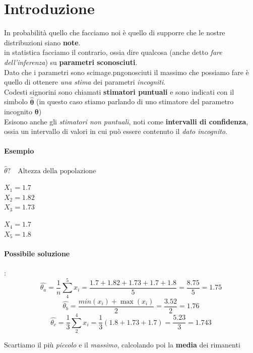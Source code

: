 \documentclass[]{article}
\begin{document}
    \tableofcontents
    \newpage 
    \section{Introduzione}
    In probabilità quello che facciamo noi è quello di supporre che le nostre distribuzioni siano \textbf{note}. \\
    in statistica facciamo il contrario, ossia dire qualcosa (anche detto \textit{fare dell'inferenza}) su \textbf{parametri sconosciuti}. \\
    Dato che i parametri sono scimage.pngonosciuti il massimo che possiamo fare è quello di ottenere \textit{una stima} dei parametri \textit{incogniti}. \\[2ex]
    Codesti signorini sono chiamati \textbf{stimatori puntuali} e sono indicati con il simbolo $\boldsymbol{\hat{\theta}}$ (in questo caso stiamo parlando di uno stimatore del parametro incognito $\boldsymbol{\theta}$) \\[2ex]
    Esisono anche gli \textit{stimatori non puntuali}, noti come \textbf{intervalli di confidenza}, ossia un intervallo di valori in cui può essere contenuto il \textit{dato incognito}.
    \paragraph{Esempio} $\hat{\theta}? \quad \text{Altezza della popolazione}$ \\[2ex]
    \begin{minipage}{0.49\textwidth}
        $X_1 = 1.7$ \\
        $X_2 = 1.82$ \\
        $X_3 = 1.73$
    \end{minipage}
    \begin{minipage}{0.49\textwidth}
        $X_4 = 1.7$ \\
        $X_5 = 1.8$ \\
    \end{minipage}
    \paragraph{Possibile soluzione}: 
    \[ \hat{\theta_a} = \frac{1}{n} \sum_{4}^{5} x_i = \frac{1.7 + 1.82 + 1.73 + 1.7 + 1.8}{5} = \frac{8.75}{5} = 1.75 \]
    \[ \hat{\theta_b} = \frac{min(x_i) + \max(x_i)}{2} = \frac{3.52}{2} = 1.76 \]
    \[ \hat{\theta_c} = \frac{1}{3} \sum_{2}^{4} x_i = \frac{1}{3} (1.8 + 1.73 + 1.7) = \frac{5.23}{3} = 1.743 \]
    \centerline{Scartiamo il più \textit{piccolo} e il \textit{massimo}, calcolando poi la \textbf{media} dei rimanenti}
\end{document}
